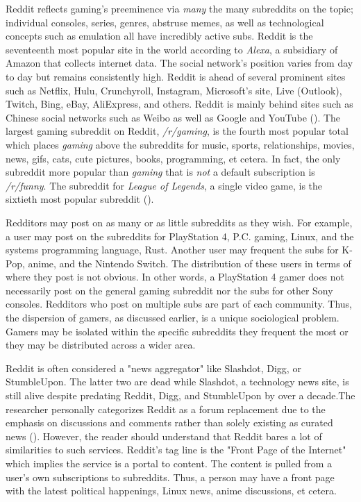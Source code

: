 \documentclass[12pt, a4paper]{article}
\begin{document}
Reddit reflects gaming's preeminence via \textit{many} the many subreddits on the topic; individual consoles, series, genres, abstruse memes, as well as technological concepts such as emulation all have incredibly active subs. Reddit is the seventeenth most popular site in the world according to \textit{Alexa}, a subsidiary of Amazon that collects internet data. The social network's position varies from day to day but remains consistently high. Reddit is ahead of several prominent sites such as Netflix, Hulu, Crunchyroll, Instagram, Microsoft's site, Live (Outlook), Twitch, Bing, eBay, AliExpress, and others. Reddit is mainly behind sites such as Chinese social networks such as Weibo as well as Google and YouTube (\cite{alexatop}). The largest gaming subreddit on Reddit, \textit{/r/gaming}, is the fourth most popular total which places \textit{gaming} above the subreddits for music, sports, relationships, movies, news, gifs, cats, cute pictures, books, programming, et cetera. In fact, the only subreddit more popular than \textit{gaming} that is \textit{not} a default subscription is \textit{/r/funny}. The subreddit for \textit{League of Legends}, a single video game, is the sixtieth most popular subreddit (\cite{redditlist}).

Redditors may post on as many or as little subreddits as they wish. For example, a user may post on the subreddits for PlayStation 4, P.C. gaming, Linux, and the systems programming language, Rust. Another user may frequent the subs for K-Pop, anime, and the Nintendo Switch. The distribution of these users in terms of where they post is not obvious. In other words, a PlayStation 4 gamer does not necessarily post on the general gaming subreddit nor the subs for other Sony consoles. Redditors who post on multiple subs are part of each community. Thus, the dispersion of gamers, as discussed earlier, is a unique sociological problem. Gamers may be isolated within the specific subreddits they frequent the most or they may be distributed across a wider area.

Reddit is often considered a "news aggregator" like Slashdot, Digg, or StumbleUpon. The latter two are dead while Slashdot, a technology news site, is still alive despite predating Reddit, Digg, and StumbleUpon by over a decade.The researcher personally categorizes Reddit as a forum replacement due to the emphasis on discussions and comments rather than solely existing as curated news (\cite{tbower_2011}). However, the reader should understand that Reddit bares a lot of similarities to such services. Reddit's tag line is the "Front Page of the Internet" which implies the service is a portal to content. The content is pulled from a user's own subscriptions to subreddits. Thus, a person may have a front page with the latest political happenings, Linux news, anime discussions, et cetera.
\end{document}
